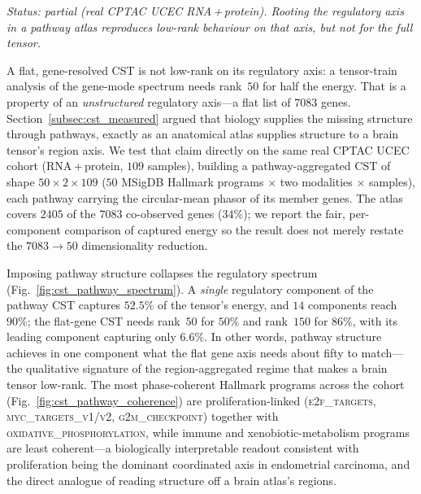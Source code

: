 \documentclass[preprint,12pt,amsmath,amssymb,superscriptaddress,floatfix]{revtex4-2}
\begin{document}
\emph{Status: partial (real CPTAC UCEC RNA\,+\,protein). Rooting the regulatory
axis in a pathway atlas reproduces low-rank behaviour on that axis, but not for
the full tensor.}

A flat, gene-resolved CST is not low-rank on its regulatory axis: a
tensor-train analysis of the gene-mode spectrum needs rank~$50$ for half the
energy. That is a property of an \emph{unstructured} regulatory
axis---a flat list of $7083$ genes. Section~\ref{subsec:cst_measured} argued
that biology supplies the missing structure through pathways, exactly as an
anatomical atlas supplies structure to a brain tensor's region axis. We test
that claim directly on the same real CPTAC UCEC cohort (RNA\,+\,protein,
$109$ samples), building a pathway-aggregated CST of shape
$50\times2\times109$ ($50$ MSigDB Hallmark programs $\times$ two modalities
$\times$ samples), each pathway carrying the circular-mean phasor of its
member genes. The atlas covers $2405$ of the $7083$ co-observed genes
($34\%$); we report the fair, per-component comparison of captured energy so
the result does not merely restate the $7083\!\rightarrow\!50$ dimensionality
reduction.

Imposing pathway structure collapses the regulatory spectrum
(Fig.~\ref{fig:cst_pathway_spectrum}). A \emph{single} regulatory component of
the pathway CST captures $52.5\%$ of the tensor's energy, and $14$ components
reach $90\%$; the flat-gene CST needs rank~$50$ for $50\%$ and rank~$150$ for
$86\%$, with its leading component capturing
only $6.6\%$. In other words, pathway structure achieves in one component what
the flat gene axis needs about fifty to match---the qualitative signature of
the region-aggregated regime that makes a brain tensor low-rank. The most
phase-coherent Hallmark programs across the cohort
(Fig.~\ref{fig:cst_pathway_coherence}) are proliferation-linked
(\textsc{e2f\_targets}, \textsc{myc\_targets\_v1/v2}, \textsc{g2m\_checkpoint})
together with \textsc{oxidative\_phosphorylation}, while immune and
xenobiotic-metabolism programs are least coherent---a biologically
interpretable readout consistent with proliferation being the dominant
coordinated axis in endometrial carcinoma, and the direct analogue of reading
structure off a brain atlas's regions.
\end{document}
